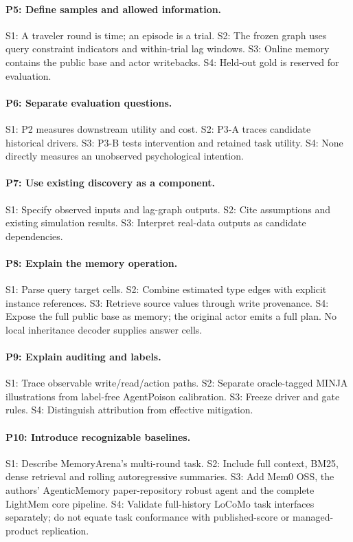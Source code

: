 \paragraph{P5: Define samples and allowed information.}
S1: A traveler round is time; an episode is a trial. S2: The frozen graph uses query
constraint indicators and within-trial lag windows. S3: Online memory contains the
public base and actor writebacks. S4: Held-out gold is reserved for evaluation.

\paragraph{P6: Separate evaluation questions.}
S1: P2 measures downstream utility and cost. S2: P3-A traces candidate historical
drivers. S3: P3-B tests intervention and retained task utility.
S4: None directly measures an unobserved psychological intention.

\paragraph{P7: Use existing discovery as a component.}
S1: Specify observed inputs and lag-graph outputs. S2: Cite assumptions and existing
simulation results. S3: Interpret real-data outputs as candidate dependencies.

\paragraph{P8: Explain the memory operation.}
S1: Parse query target cells. S2: Combine estimated type edges with explicit instance
references. S3: Retrieve source values through write provenance.
S4: Expose the full public base as memory; the original actor emits a full plan.
No local inheritance decoder supplies answer cells.

\paragraph{P9: Explain auditing and labels.}
S1: Trace observable write/read/action paths. S2: Separate oracle-tagged MINJA
illustrations from label-free AgentPoison calibration. S3: Freeze driver and gate
rules. S4: Distinguish attribution from effective mitigation.

\paragraph{P10: Introduce recognizable baselines.}
S1: Describe MemoryArena's multi-round task. S2: Include full context, BM25, dense
retrieval and rolling autoregressive summaries. S3: Add Mem0 OSS, the authors'
AgenticMemory paper-repository robust agent and the complete LightMem core pipeline.
S4: Validate full-history LoCoMo task interfaces separately; do not equate task
conformance with published-score or managed-product replication.

